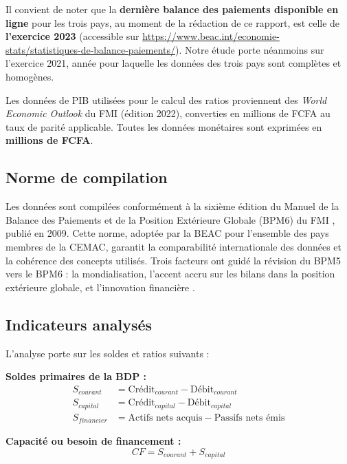 \documentclass[12pt,a4paper]{article}
\begin{document}
Il convient de noter que la \textbf{dernière balance des paiements disponible en ligne}
pour les trois pays, au moment de la rédaction de ce rapport, est celle de \textbf{l'exercice
2023} (accessible sur \url{https://www.beac.int/economie-stats/statistiques-de-balance-paiements/}).
Notre étude porte néanmoins sur l'exercice 2021, année pour laquelle les données des trois
pays sont complètes et homogènes.

Les données de PIB utilisées pour le calcul des ratios proviennent des \textit{World Economic
Outlook} du FMI (édition 2022), converties en millions de FCFA au taux de parité applicable.
Toutes les données monétaires sont exprimées en \textbf{millions de FCFA}.

\subsection{Norme de compilation}

Les données sont compilées conformément à la sixième édition du Manuel de la Balance des
Paiements et de la Position Extérieure Globale (BPM6) du FMI \parencite{imf2009bpm6},
publié en 2009. Cette norme, adoptée par la BEAC pour l'ensemble des pays membres de la
CEMAC, garantit la comparabilité internationale des données et la cohérence des concepts
utilisés. Trois facteurs ont guidé la révision du BPM5 vers le BPM6 : la mondialisation,
l'accent accru sur les bilans dans la position extérieure globale, et l'innovation financière
\parencite{ecbbpm6}.

\subsection{Indicateurs analysés}

L'analyse porte sur les soldes et ratios suivants :

\textbf{Soldes primaires de la BDP :}
\begin{align}
  S_{courant}  &= \text{Crédit}_{courant} - \text{Débit}_{courant} \label{eq:solde_courant}\\
  S_{capital}  &= \text{Crédit}_{capital} - \text{Débit}_{capital} \label{eq:solde_capital}\\
  S_{financier}&= \text{Actifs nets acquis} - \text{Passifs nets émis} \label{eq:solde_fin}
\end{align}

\textbf{Capacité ou besoin de financement :}
\begin{equation}
  CF = S_{courant} + S_{capital}
  \label{eq:cf}
\end{equation}
\end{document}
